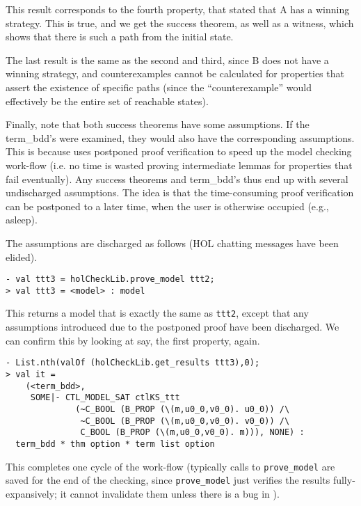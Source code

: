 This result corresponds to the fourth property, that stated that A has a winning strategy. This is true, and we get the success theorem, as well as a witness, which shows that there is such a path from the initial state.

The last result is the same as the second and third, since B does not have a winning strategy, and counterexamples cannot be calculated for properties that assert the existence of specific paths (since the ``counterexample'' would effectively be the entire set of reachable states).

Finally, note that both success theorems have some assumptions. If the term\_bdd's were examined, they would also have the corresponding assumptions. This is because \hc{} uses postponed proof verification to speed up the model checking work-flow (i.e. no time is wasted proving intermediate lemmas for properties that fail eventually). Any success theorems and term\_bdd's thus end up with several undischarged assumptions. The idea is that the time-consuming proof verification can be postponed to a later time, when the user is otherwise occupied (e.g., asleep).

The assumptions are discharged as follows (HOL chatting messages have been elided).

\begin{session}\begin{verbatim}
- val ttt3 = holCheckLib.prove_model ttt2;
> val ttt3 = <model> : model
\end{verbatim}\end{session}

This returns a model that is exactly the same as \texttt{ttt2}, except that any assumptions introduced due to the postponed proof have been discharged. We can confirm this by looking at say, the first property, again.

\begin{session}\begin{verbatim}
- List.nth(valOf (holCheckLib.get_results ttt3),0);
> val it =
    (<term_bdd>,
     SOME|- CTL_MODEL_SAT ctlKS_ttt
              (~C_BOOL (B_PROP (\(m,u0_0,v0_0). u0_0)) /\
               ~C_BOOL (B_PROP (\(m,u0_0,v0_0). v0_0)) /\
               C_BOOL (B_PROP (\(m,u0_0,v0_0). m))), NONE) :
  term_bdd * thm option * term list option
\end{verbatim}\end{session}

This completes one cycle of the \hc{} work-flow (typically calls to \texttt{prove\_model} are saved for the end of the checking, since  \texttt{prove\_model} just verifies the results fully-expansively; it cannot invalidate them unless there is a bug in \hc{}).


